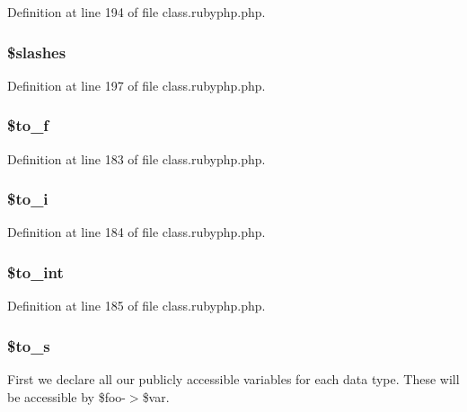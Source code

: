 Definition at line 194 of file class.\-rubyphp.\-php.

\hypertarget{classr_ac95fd27a35f2d9674ef3760a4ea1d07f}{
\subsubsection[{\$slashes}]{\setlength{\rightskip}{0pt plus 5cm}\${\bf slashes}}}\label{classr_ac95fd27a35f2d9674ef3760a4ea1d07f}


Definition at line 197 of file class.\-rubyphp.\-php.

\hypertarget{classr_a85a2ada0b16d9e59f094e77df5848459}{
\subsubsection[{\$to\-\_\-f}]{\setlength{\rightskip}{0pt plus 5cm}\${\bf to\-\_\-f}}}\label{classr_a85a2ada0b16d9e59f094e77df5848459}


Definition at line 183 of file class.\-rubyphp.\-php.

\hypertarget{classr_afecc47a810cf510aff6387286b9c0e73}{
\subsubsection[{\$to\-\_\-i}]{\setlength{\rightskip}{0pt plus 5cm}\${\bf to\-\_\-i}}}\label{classr_afecc47a810cf510aff6387286b9c0e73}


Definition at line 184 of file class.\-rubyphp.\-php.

\hypertarget{classr_a41eb7bfd09e3b6ad118551accfaad638}{
\subsubsection[{\$to\-\_\-int}]{\setlength{\rightskip}{0pt plus 5cm}\${\bf to\-\_\-int}}}\label{classr_a41eb7bfd09e3b6ad118551accfaad638}


Definition at line 185 of file class.\-rubyphp.\-php.

\hypertarget{classr_a5469620d055732b419fff71704232d2f}{
\subsubsection[{\$to\-\_\-s}]{\setlength{\rightskip}{0pt plus 5cm}\${\bf to\-\_\-s}}}\label{classr_a5469620d055732b419fff71704232d2f}
First we declare all our publicly accessible variables for each data type. These will be accessible by \$foo-\/$>$\$var.

